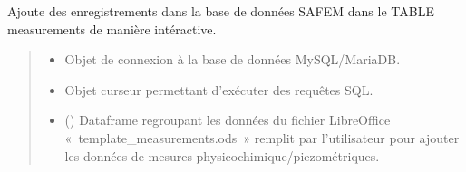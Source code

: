 \documentclass[letterpaper,10pt,french]{sphinxmanual}
\begin{document}
\begin{fulllineitems}
\label{\detokenize{library:lib_sql.insert_data_measurements}}
\pysigstartsignatures
\pysiglinewithargsret
{}
{\sphinxparamcomma {}\sphinxparamcomma {}}
{}
\pysigstopsignatures
\sphinxAtStartPar
Ajoute des enregistrements dans la base de données SAFE\sphinxhyphen{}M dans le TABLE
measurements de manière intéractive.
\begin{quote}\begin{description}
\begin{itemize}
\item {} 
\sphinxAtStartPar
{} \textendash{} Objet de connexion à la base de données MySQL/MariaDB.

\item {} 
\sphinxAtStartPar
{} \textendash{} Objet curseur permettant d’exécuter des requêtes SQL.

\item {} 
\sphinxAtStartPar
{} () \textendash{} Dataframe regroupant les données du fichier LibreOffice « template\_measurements.ods »
remplit par l’utilisateur pour ajouter les données de mesures physico\sphinxhyphen{}chimique/piezométriques.

\end{itemize}

\end{description}\end{quote}

\end{fulllineitems}

\end{document}
